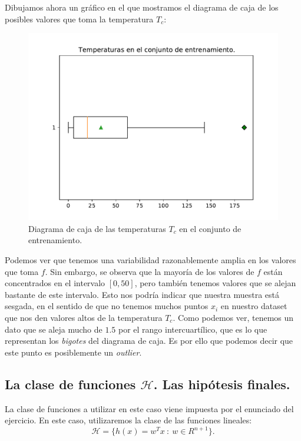\documentclass[a4paper, 20pt]{article}
\begin{document}
Dibujamos ahora un gráfico en el que mostramos el diagrama de caja de los posibles valores que toma la temperatura $T_c$:

\begin{figure}[H]
  \centering
  \includegraphics[scale = 0.4]{boxplot_y.pdf}
  \caption{Diagrama de caja de las temperaturas $T_c$ en el conjunto de entrenamiento.}
\end{figure}

Podemos ver que tenemos una variabilidad razonablemente amplia en los valores que toma $f$. Sin embargo, se observa que la mayoría de los valores de $f$ están concentrados en el intervalo $[0,50]$, pero también tenemos valores que se alejan bastante de este intervalo. Esto nos podría indicar que nuestra muestra está sesgada, en el sentido de que no tenemos muchos puntos $x_i$ en nuestro dataset que nos den valores altos de la temperatura $T_c$.  Como podemos ver, tenemos un dato que se aleja mucho de $1.5$ por el rango intercuartílico, que es lo que representan los \emph{bigotes} del diagrama de caja. Es por ello que podemos decir que este punto es posiblemente un \emph{outlier}.


\subsection{La clase de funciones $\mathcal H$. Las hipótesis finales.}

La clase de funciones a utilizar en este caso viene impuesta por el enunciado del ejercicio. En este caso, utilizaremos la clase de las funciones lineales:
$$
\mathcal H = \{ h(x) = w^T x \ : \ w \in R^{n+1}\}.
$$
\end{document}
